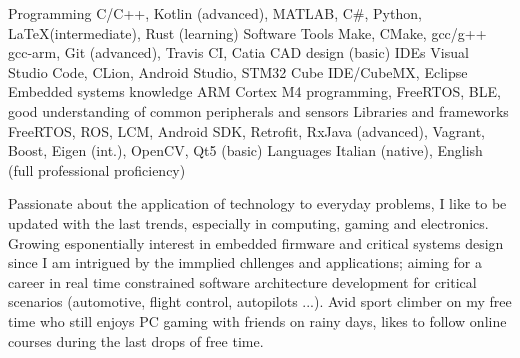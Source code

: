 \vspace*{-16pt}
\begin{cventries}
    
    \begin{cvskills}
        \cvskill
        {Programming}
        {C/C++, Kotlin (advanced), MATLAB, C\#, Python, \LaTeX (intermediate), Rust (learning)}
        \cvskill
        {Software Tools}
        {Make, CMake, gcc/g++ gcc-arm, Git (advanced), Travis CI, Catia CAD design (basic)}
        \cvskill
        {IDEs}
        {Visual Studio Code, CLion, Android Studio, STM32 Cube IDE/CubeMX, Eclipse}
        \cvskill
        {Embedded systems knowledge}
        {ARM Cortex M4 programming, FreeRTOS, BLE, good understanding \linebreak of common peripherals and sensors}
        \cvskill
        {Libraries and frameworks}
        {FreeRTOS, ROS, LCM, Android SDK, Retrofit, RxJava (advanced), Vagrant, Boost, Eigen (int.), \linebreak OpenCV, Qt5 (basic)}
        \cvskill
        {Languages}
        {Italian (native), English (full professional proficiency)}
    \end{cvskills}

\end{cventries}

\begin{cvparagraph}
   Passionate about the application of technology to everyday problems, I like to be updated with the last trends, especially in computing, gaming and electronics. 
   Growing esponentially interest in embedded firmware and critical systems design since I am intrigued by the immplied chllenges and applications; aiming for a career in real time constrained software architecture development for critical scenarios (automotive, flight control, autopilots ...).
   Avid sport climber on my free time who still enjoys PC gaming with friends on rainy days, likes to follow online courses during the last drops of free time.
\end{cvparagraph}
